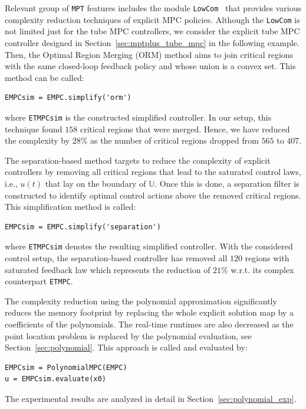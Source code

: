 \documentclass[letterpaper, 10 pt, conference]{ieeeconf}
\begin{document}
Relevant group of \texttt{MPT} features includes the module \texttt{LowCom}~\cite{KH15} that provides various complexity reduction techniques of explicit MPC policies. Although the \texttt{LowCom} is not limited just for the tube MPC controllers, we consider the explicit tube MPC controller designed in Section~\ref{sec:mptplus_tube_mpc} in the following example. Then, the Optimal Region Merging (ORM) method aims to join critical regions with the same closed-loop feedback policy and whose union is a convex set. This method can be called: 
\begin{lstlisting}[style=Matlab-editor]
EMPCsim = EMPC.simplify('orm')
\end{lstlisting}
where \verb|ETMPCsim| is the constructed simplified controller. In our setup, this technique found $158$ critical regions that were merged. Hence, we have reduced the complexity by $28\%$ as the number of critical regions dropped from $565$ to $407$. 

%
%
The separation-based method targets to reduce the complexity of explicit controllers by removing all critical regions that lead to the saturated control laws, i.e., $u(t)$ that lay on the boundary of $\mathbb{U}$. Once this is done, a separation filter is constructed to identify optimal control actions above the removed critical regions. This simplification method is called:
\begin{lstlisting}[style=Matlab-editor]
EMPCsim = EMPC.simplify('separation')
\end{lstlisting}
where \verb|ETMPCsim| denotes the resulting simplified controller. With the considered control setup, the separation-based controller has removed all $120$ regions with saturated feedback law which represents the reduction of $21\%$ w.r.t. its complex counterpart \verb|ETMPC|.

The complexity reduction using the polynomial approximation significantly reduces the memory footprint by replacing the whole explicit solution map by a coefficients of the polynomials. The real-time runtimes are also decreased as the point location problem is replaced by the polynomial evaluation, see Section~\ref{sec:polynomial}. This approach is called and evaluated by:
\begin{lstlisting}[style=Matlab-editor]
EMPCsim = PolynomialMPC(EMPC)
u = EMPCsim.evaluate(x0)
\end{lstlisting}
The experimental results are analyzed in detail in Section~\ref{sec:polynomial_exp}.
\end{document}
